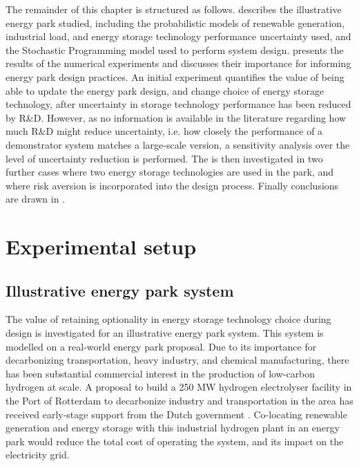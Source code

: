 The remainder of this chapter is structured as follows.
 describes the illustrative energy park studied, including the probabilistic models of renewable generation, industrial load, and energy storage technology performance uncertainty used, and the Stochastic Programming model used to perform system design.
 presents the results of the numerical experiments and discusses their importance for informing energy park design practices. An initial experiment quantifies the value of being able to update the energy park design, and change choice of energy storage technology, after uncertainty in storage technology performance has been reduced by R\&D. However, as no information is available in the literature regarding how much R\&D might reduce uncertainty, i.e. how closely the performance of a demonstrator system matches a large-scale version, a sensitivity analysis over the level of uncertainty reduction is performed. The  is then investigated in two further cases where two energy storage technologies are used in the park, and where risk aversion is incorporated into the design process.
Finally conclusions are drawn in .


\newpage
\section{Experimental setup} \label{sec:parks-experiment}


\subsection{Illustrative energy park system} \label{sec:parks-setup}


The value of retaining optionality in energy storage technology choice during design is investigated for an illustrative energy park system. This system is modelled on a real-world energy park proposal. Due to its importance for decarbonizing transportation, heavy industry, and chemical manufacturing, there has been substantial commercial interest in the production of low-carbon hydrogen at scale. A proposal to build a 250 MW hydrogen electrolyser facility in the Port of Rotterdam to decarbonize industry and transportation in the area has received early-stage support from the Dutch government \citep{2022ProjectH2Fifty,bp2022GreenHydrogenProject}.
Co-locating renewable generation and energy storage with this industrial hydrogen plant in an energy park would reduce the total cost of operating the system, and its impact on the electricity grid.


